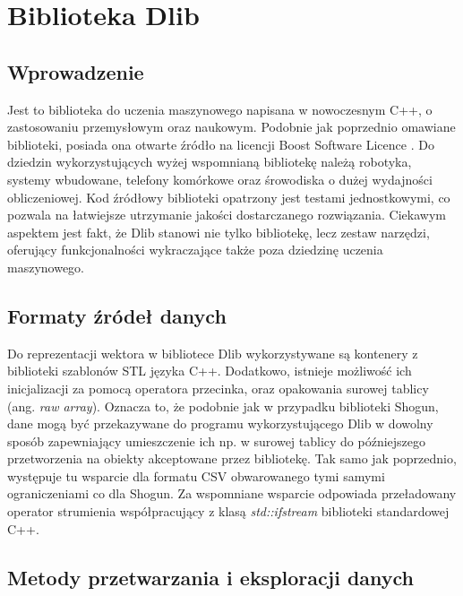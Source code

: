 \chapter{Biblioteka Dlib}

\section{Wprowadzenie}

Jest to biblioteka do uczenia maszynowego napisana w nowoczesnym C++, o zastosowaniu przemysłowym oraz naukowym. Podobnie jak poprzednio omawiane biblioteki, posiada ona otwarte źródło na licencji Boost Software Licence \cite{dlib:license}. Do dziedzin wykorzystujących wyżej wspomnianą bibliotekę należą robotyka, systemy wbudowane, telefony komórkowe oraz śrowodiska o dużej wydajności obliczeniowej. Kod źródłowy biblioteki opatrzony jest testami jednostkowymi, co pozwala na łatwiejsze utrzymanie jakości dostarczanego rozwiązania. Ciekawym aspektem jest fakt, że Dlib stanowi nie tylko bibliotekę, lecz zestaw narzędzi, oferujący funkcjonalności wykraczające także poza dziedzinę uczenia maszynowego.

\section{Formaty źródeł danych}

Do reprezentacji wektora w bibliotece Dlib wykorzystywane są kontenery z biblioteki szablonów STL języka C++. Dodatkowo, istnieje możliwość ich inicjalizacji za pomocą operatora przecinka, oraz opakowania surowej tablicy (ang. \textit{raw array}). Oznacza to, że podobnie jak w przypadku biblioteki Shogun, dane mogą być przekazywane do programu wykorzystującego Dlib w dowolny sposób zapewniający umieszczenie ich np. w surowej tablicy do późniejszego przetworzenia na obiekty akceptowane przez bibliotekę. Tak samo jak poprzednio, występuje tu wsparcie dla formatu CSV obwarowanego tymi samymi ograniczeniami co dla Shogun. Za wspomniane wsparcie odpowiada przeładowany operator strumienia współpracujący z klasą \textit{std::ifstream} biblioteki standardowej C++.


\section{Metody przetwarzania i eksploracji danych}

